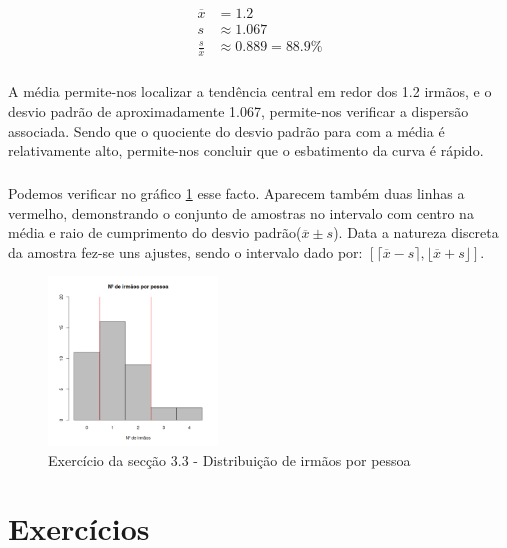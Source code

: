 \documentclass[11pt,a4paper]{report}
\begin{document}
\begin{align*}
	\overline{x} &= 1.2\\
	s &\approx 1.067 \\
	\frac{s}{\overline{x}} &\approx 0.889 = 88.9 \%
\end{align*}

\paragraph{} A média permite-nos localizar a tendência central em redor dos
1.2 irmãos, e o desvio padrão de aproximadamente 1.067, permite-nos verificar
a dispersão associada. Sendo que o quociente do desvio padrão para com a média
é relativamente alto, permite-nos concluir que o esbatimento da curva é
rápido.

\paragraph{} Podemos verificar no gráfico \ref{fig:ex3_3} esse facto. Aparecem
também duas linhas a vermelho, demonstrando o conjunto de amostras no
intervalo com centro na média e raio de cumprimento do desvio
padrão($\overline{x} \pm s$). Data a natureza discreta da amostra fez-se uns
ajustes, sendo o intervalo dado por:
$[\lceil \overline{x} - s \rceil, \lfloor \overline{x} + s \rfloor]$.

\vspace{0.5cm}




\begin{figure}[h!]
	\centering
	\includegraphics[width=0.4\textwidth]{./recursos/ex3_3.png}
	\caption{Exercício da secção 3.3 - Distribuição de irmãos por pessoa}
	\label{fig:ex3_3}
\end{figure}

\clearpage
\chapter{Exercícios}
\end{document}
